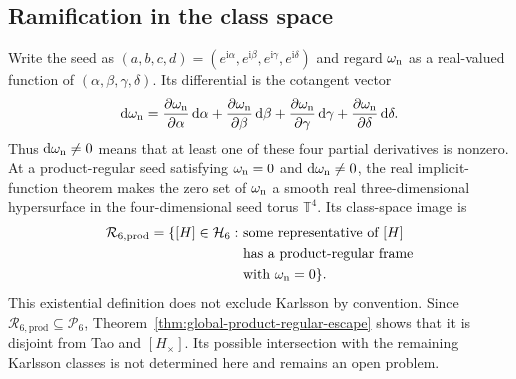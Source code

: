 \documentclass[aps,prx,reprint,nofootinbib,twoside,superscriptaddress,longbibliography,floatfix]{revtex4-2}
\theoremstyle{definition}
\newcommand{\I}{\mathrm i}
\newcommand{\HH}{\mathcal H}
\begin{document}
\subsection{Ramification in the class space}
\label{subsec:intrinsic-loci-product-ramification}

Write the seed as $(a,b,c,d)=(e^{\I\alpha},e^{\I\beta},e^{\I\gamma},e^{\I\delta})$ and regard $\omega_{\rm n}$ as a real-valued function of $(\alpha,\beta,\gamma,\delta)$. Its differential is the cotangent vector
\begin{equation}
\mathrm d\omega_{\rm n}=\frac{\partial\omega_{\rm n}}{\partial\alpha}\,\mathrm d\alpha+\frac{\partial\omega_{\rm n}}{\partial\beta}\,\mathrm d\beta +\frac{\partial\omega_{\rm n}}{\partial\gamma}\,\mathrm d\gamma+\frac{\partial\omega_{\rm n}}{\partial\delta}\,\mathrm d\delta.
\label{eq:normalized-discriminant-differential-main}
\end{equation}
Thus $\mathrm d\omega_{\rm n}\neq0$ means that at least one of these four partial derivatives is nonzero. At a product-regular seed satisfying $\omega_{\rm n}=0$ and $\mathrm d\omega_{\rm n}\neq0$, the real implicit-function theorem makes the zero set of $\omega_{\rm n}$ a smooth real three-dimensional hypersurface in the four-dimensional seed torus $\mathbb{T}^4$. Its class-space image is
\begin{equation}
\begin{aligned}
\mathcal R_{6,\mathrm{prod}}=\{[H]\in\HH_6:\ &\text{some representative of $[H]$}\\
&\text{has a product-regular frame}\\
&\text{with $\omega_{\rm n}=0$}\}.
\end{aligned}
\label{eq:product-ramification-locus}
\end{equation}
This existential definition does not exclude Karlsson by convention. Since $\mathcal R_{6,\mathrm{prod}}\subseteq\mathcal P_6$, Theorem~\ref{thm:global-product-regular-escape} shows that it is disjoint from Tao and $[H_\times]$. Its possible intersection with the remaining Karlsson classes is not determined here and remains an open problem.
\end{document}
